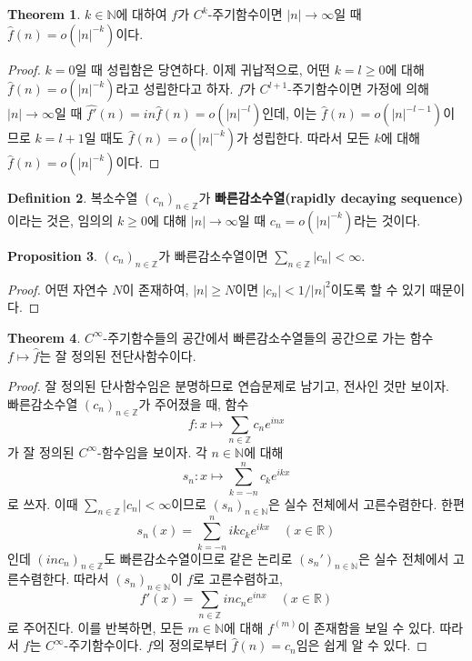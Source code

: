 \documentclass[11pt]{book}
\numberwithin{equation}{chapter}
\def\NN{\mathbb{N}}
\def\ZZ{\mathbb{Z}}
\def\RR{\mathbb{R}}
\newcommand{\abs}[1]{\left\vert#1\right\vert}
\theoremstyle{definition}
\newtheorem{thm}{Theorem}[section]
\newtheorem{prop}[thm]{Proposition}
\newtheorem{defn}[thm]{Definition}
\begin{document}
\begin{thm} \label{15.3.4}
    \(k \in \NN\)에 대하여 \(f\)가 \(C^k\)-주기함수이면 \(\abs{n} \to \infty\)일 때 \(\hat{f}(n) = o(\abs{n}^{-k})\)이다.
\end{thm}
\begin{proof}
    \(k = 0\)일 때 성립함은 당연하다. 이제 귀납적으로, 어떤 \(k = l\ge 0\)에 대해 \(\hat{f}(n) = o(\abs{n}^{-k})\)라고 성립한다고 하자. \(f\)가 \(C^{l+1}\)-주기함수이면 가정에 의해 \(\abs{n} \to \infty\)일 때 \(\widehat{f'}(n) = in \hat{f}(n) = o(\abs{n}^{-l})\)인데, 이는 \(\hat{f}(n) = o(\abs{n}^{-l-1})\)이므로 \(k = l+1\)일 때도 \(\hat{f}(n) = o(\abs{n}^{-k})\)가 성립한다. 따라서 모든 \(k\)에 대해 \(\hat{f}(n) = o(\abs{n}^{-k})\)이다.
\end{proof}

\begin{defn}
    복소수열 \((c_n)_{n \in \ZZ}\)가 \textbf{빠른감소수열(rapidly decaying sequence)}이라는 것은, 임의의 \(k \ge 0\)에 대해 \(\abs{n} \to \infty\)일 때 \(c_n = o(\abs{n}^{-k})\)라는 것이다.
\end{defn}

\begin{prop}
    \((c_n)_{n \in \ZZ}\)가 빠른감소수열이면 \(\sum_{n \in \ZZ} \abs{c_n} < \infty\).
\end{prop}
\begin{proof}
    어떤 자연수 \(N\)이 존재하여, \(\abs{n} \ge N\)이면 \(\abs{c_n} < 1/\abs{n}^2\)이도록 할 수 있기 때문이다.
\end{proof}

\begin{thm}
    \(C^\infty\)-주기함수들의 공간에서 빠른감소수열들의 공간으로 가는 함수 \(f \mapsto \hat{f}\)는 잘 정의된 전단사함수이다.
\end{thm}
\begin{proof}
    잘 정의된 단사함수임은 분명하므로 연습문제로 남기고, 전사인 것만 보이자.\\
    빠른감소수열 \((c_n)_{n \in \ZZ}\)가 주어졌을 때, 함수
    \[
        f : x \mapsto \sum_{n \in \ZZ} c_n e^{inx}
    \]
    가 잘 정의된 \(C^\infty\)-함수임을 보이자. 각 \(n \in \NN\)에 대해
    \[
        s_n : x \mapsto \sum_{k=-n}^n c_k e^{ikx}
    \]
    로 쓰자. 이때 \(\sum_{n \in \ZZ} \abs{c_n} < \infty\)이므로 \((s_n)_{n \in \NN}\)은 실수 전체에서 고른수렴한다. 한편
    \[
        s_n(x) = \sum_{k=-n}^n ikc_k e^{ikx} \quad (x \in \RR)
    \]
    인데 \((inc_n)_{n \in \ZZ}\)도 빠른감소수열이므로 같은 논리로 \((s_n')_{n \in \NN}\)은 실수 전체에서 고른수렴한다. 따라서 \((s_n)_{n \in \NN}\)이 \(f\)로 고른수렴하고,
    \[
        f'(x) = \sum_{n \in \ZZ} in c_n e^{inx} \quad (x \in \RR)
    \]
    로 주어진다. 이를 반복하면, 모든 \(m \in \NN\)에 대해 \(f^{(m)}\)이 존재함을 보일 수 있다. 따라서 \(f\)는 \(C^\infty\)-주기함수이다. \(f\)의 정의로부터 \(\hat{f}(n) = c_n\)임은 쉽게 알 수 있다.
\end{proof}
\end{document}
